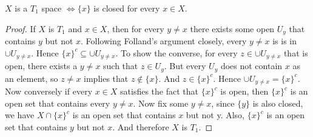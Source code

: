 \documentclass[../../main.tex]{subfiles}
\begin{document}
\begin{wts}
$X$ is a $T_1$ space $\iff \{x\}$ is closed for every $x\in X$.
\end{wts}
\begin{proof}
If $X$ is $T_1$ and $x\in X$, then for every $y\neq x$ there exists some open $U_y$ that contains $y$ but not $x$. Following Folland's argument closely, every $y\neq x$ is is in $\cup U_{y\neq x}$. Hence $\{x\}^c\subseteq \cup U_{y\neq x}$. To show the converse, for every $z\in\cup U_{y\neq x}$ that is open, there exists a $y\neq x$ such that $z\in U_y$. But every $U_y$ does not contain $x$ as an element, so $z\neq x$ implies that $z\notin \{x\}$. And $z\in \{x\}^c$. Hence $\cup U_{y\neq x} = \{x\}^c$.\\

Now conversely if every $x\in X$ satisfies the fact that $\{x\}^c$ is open, then $\{x\}^c$ is an open set that contains every $y\neq x$. Now fix some $y\neq x$, since $\{y\}$ is also closed, we have $X\cap \{x\}^c$ is an open set that contains $x$ but not y. Also, $\{x\}^c$ is an open set that contains $y$ but not $x$. And therefore $X$ is $T_1$.
\end{proof}
\end{document}
